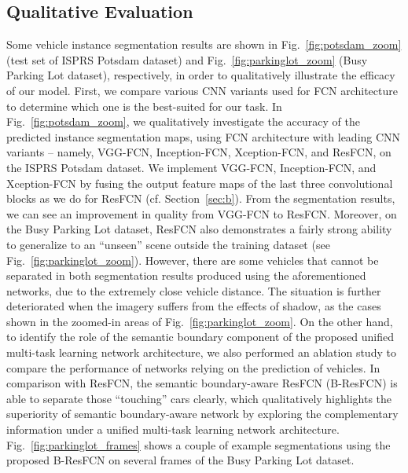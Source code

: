 \documentclass[journal]{IEEEtran}
\begin{document}
\subsection{Qualitative Evaluation}
Some vehicle instance segmentation results are shown in Fig.~\ref{fig:potsdam_zoom} (test set of ISPRS Potsdam dataset) and Fig.~\ref{fig:parkinglot_zoom} (Busy Parking Lot dataset), respectively, in order to qualitatively illustrate the efficacy of our model. First, we compare various CNN variants used for FCN architecture to determine which one is the best-suited for our task. In Fig.~\ref{fig:potsdam_zoom}, we qualitatively investigate the accuracy of the predicted instance segmentation maps, using FCN architecture with leading CNN variants -- namely, VGG\cite{VGGNet}-FCN, Inception\cite{Szegedy16}-FCN, Xception\cite{Chollet17}-FCN, and ResFCN, on the ISPRS Potsdam dataset. We implement VGG-FCN, Inception-FCN, and Xception-FCN by fusing the output feature maps of the last three convolutional blocks as we do for ResFCN (cf. Section~\ref{sec:b}). From the segmentation results, we can see an improvement in quality from VGG-FCN to ResFCN. Moreover, on the Busy Parking Lot dataset, ResFCN also demonstrates a fairly strong ability to generalize to an ``unseen'' scene outside the training dataset (see Fig.~\ref{fig:parkinglot_zoom}). However, there are some vehicles that cannot be separated in both segmentation results produced using the aforementioned networks, due to the extremely close vehicle distance. The situation is further deteriorated when the imagery suffers from the effects of shadow, as the cases shown in the zoomed-in areas of Fig.~\ref{fig:parkinglot_zoom}. On the other hand, to identify the role of the semantic boundary component of the proposed unified multi-task learning network architecture, we also performed an ablation study to compare the performance of networks relying on the prediction of vehicles. In comparison with ResFCN, the semantic boundary-aware ResFCN (B-ResFCN) is able to separate those ``touching'' cars clearly, which qualitatively highlights the superiority of semantic boundary-aware network by exploring the complementary information under a unified multi-task learning network architecture. Fig.~\ref{fig:parkinglot_frames} shows a couple of example segmentations using the proposed B-ResFCN on several frames of the Busy Parking Lot dataset.
\end{document}
